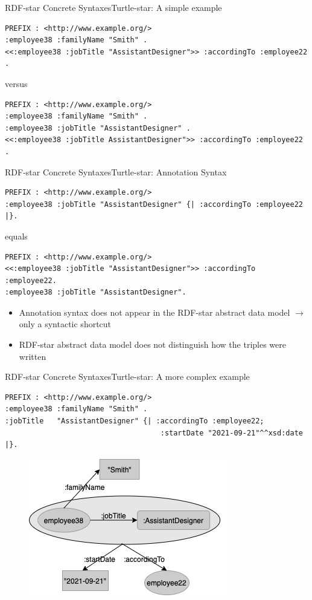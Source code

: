 \documentclass[aspectratio=169]{beamer}
\begin{document}
\begin{frame}[fragile]{RDF-star Concrete Syntaxes}{Turtle-star: A simple example}
    \begin{lstlisting}[language=TTL]
PREFIX : <http://www.example.org/>
:employee38 :familyName "Smith" .
<<:employee38 :jobTitle "AssistantDesigner">> :accordingTo :employee22 . 
    \end{lstlisting}
    versus
    \begin{lstlisting}[language=TTL]
PREFIX : <http://www.example.org/>
:employee38 :familyName "Smith" .
:employee38 :jobTitle "AssistantDesigner" .
<<:employee38 :jobTitle AssistantDesigner">> :accordingTo :employee22 . 
    \end{lstlisting}
\end{frame}

\begin{frame}[fragile]{RDF-star Concrete Syntaxes}{Turtle-star: Annotation Syntax}
    \begin{lstlisting}[language=TTL]
PREFIX : <http://www.example.org/>
:employee38 :jobTitle "AssistantDesigner" {| :accordingTo :employee22 |}. 
    \end{lstlisting}
    equals
    \begin{lstlisting}[language=TTL]
PREFIX : <http://www.example.org/>
<<:employee38 :jobTitle "AssistantDesigner">> :accordingTo :employee22. 
:employee38 :jobTitle "AssistantDesigner".
    \end{lstlisting}
    \begin{itemize}
        \item Annotation syntax does not appear in the RDF-star abstract data model $\rightarrow$ only a syntactic shortcut
        \item RDF-star abstract data model does not distinguish how the triples were written
    \end{itemize}
\end{frame}

\begin{frame}[fragile]{RDF-star Concrete Syntaxes}{Turtle-star: A more complex example}
    \begin{lstlisting}[language=TTL]
PREFIX : <http://www.example.org/>
:employee38 :familyName "Smith" .
:jobTitle   "AssistantDesigner" {| :accordingTo :employee22; 
                                    :startDate "2021-09-21"^^xsd:date |}. 
    \end{lstlisting}
    \begin{figure}
        \centering
        \includegraphics[scale=0.45]{images/Example-2-Turtle-start-Complex.png}
    \end{figure}
\end{frame}
\end{document}
